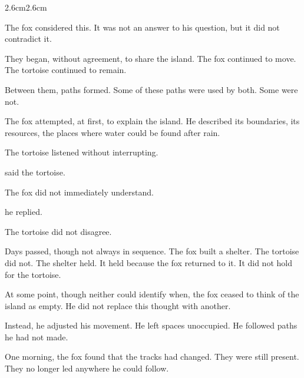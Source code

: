 \begin{adjustwidth}{2.6cm}{2.6cm}
\vspace{2em}

The fox considered this. It was not an answer to his question, but it did not
contradict it.

\vspace{2em}

They began, without agreement, to share the island. The fox continued to move.
The tortoise continued to remain.

Between them, paths formed. Some of these paths were used by both. Some were not.

\vspace{2em}

The fox attempted, at first, to explain the island. He described its boundaries, its
resources, the places where water could be found after rain.

The tortoise listened without interrupting.

\vspace{2em}

 said the tortoise.

\vspace{2em}

The fox did not immediately understand.

\vspace{2em}

 he replied.

\vspace{2em}

The tortoise did not disagree.

\vspace{2em}

Days passed, though not always in sequence. The fox built a shelter. The tortoise
did not. The shelter held. It held because the fox returned to it. It did not hold for
the tortoise.

\vspace{2em}

At some point, though neither could identify when, the fox ceased to think of the
island as empty. He did not replace this thought with another.

Instead, he adjusted his movement. He left spaces unoccupied. He followed paths
he had not made.

\vspace{2em}

One morning, the fox found that the tracks had changed. They were still present.
They no longer led anywhere he could follow.


\end{adjustwidth}
